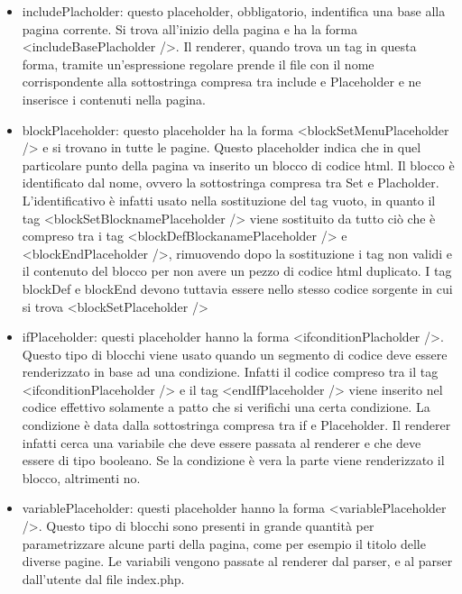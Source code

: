 \begin{itemize}
    
	\item includePlacholder: questo placeholder, obbligatorio, indentifica una base alla pagina corrente. Si trova all'inizio della pagina e ha la forma <includeBasePlacholder />. Il renderer, quando trova un tag in questa forma, tramite un'espressione
	regolare prende il file con il nome corrispondente alla sottostringa compresa tra include e Placeholder e ne inserisce i contenuti nella pagina.
	
    \item blockPlaceholder: questo placeholder ha la forma <blockSetMenuPlaceholder /> e si trovano in tutte le pagine. Questo placeholder indica che in quel particolare punto della pagina va inserito un blocco di codice html. Il blocco è identificato dal 
	nome, ovvero la sottostringa compresa tra Set e Placholder. L'identificativo è infatti usato nella sostituzione del tag vuoto, in quanto il tag <blockSetBlocknamePlaceholder /> viene sostituito da tutto ciò che è compreso tra i tag <blockDefBlockanamePlaceholder /> 
	e <blockEndPlaceholder />, rimuovendo dopo la sostituzione i tag non validi e il contenuto del blocco per non avere un pezzo di codice html duplicato. I tag blockDef e blockEnd devono tuttavia essere nello stesso codice 
	sorgente in cui si trova <blockSetPlaceholder />
	
	\item ifPlaceholder: questi placeholder hanno la forma <ifconditionPlacholder />. Questo tipo di blocchi viene usato quando un segmento di codice deve essere renderizzato in base ad una condizione. Infatti il codice compreso tra il tag <ifconditionPlaceholder /> 
	e il tag <endIfPlaceholder /> viene inserito nel codice effettivo solamente a patto che si verifichi una certa condizione. La condizione è data dalla sottostringa compresa tra if e Placeholder. Il renderer infatti cerca una variabile che deve essere passata
	al renderer e che deve essere di tipo booleano. Se la condizione è vera la parte viene renderizzato il blocco, altrimenti no.
	
	\item variablePlaceholder: questi placeholder hanno la forma <variablePlaceholder />. Questo tipo di blocchi sono presenti in grande quantità per parametrizzare alcune parti della pagina, come per esempio il titolo delle diverse pagine. Le variabili vengono 
	passate al renderer dal parser, e al parser dall'utente dal file index.php.
	
\end{itemize}

